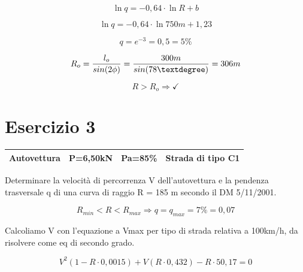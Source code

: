 \documentclass[
a4paper,
12pt, 
twoside]{scrbook}
\begin{document}
{{{{{{{{   \begin{equation}
    \ln q=-0,64\cdot \ln R+b
   \end{equation} 	
   
   \begin{equation}
   	\ln q=-0,64\cdot \ln 750m+1,23
   \end{equation} 	
   
   \begin{equation}
   	q=e^{-3}=0,5=5\%
   \end{equation} 	
   
   \begin{equation}
   	R_o=\frac{l_o}{sin(2\phi)}=\frac{300m}{sin(78\textdegree)}=306m
   \end{equation} 	
   
   \begin{equation}
   	R>R_o \Rightarrow \checkmark
   \end{equation} 	
   
   \section{Esercizio 3}
   {
   	\centering
   	\begin{tabular}{|c|c|c|c|}
   		\hline
   		\rule[-1ex]{0pt}{2.5ex}  Autovettura & P=6,50kN & Pa=85\% & Strada di tipo C1 \\
   		\hline
   	\end{tabular}\par
   }
   \begin{boxK}
   	Determinare la velocità di percorrenza V dell'autovettura e la pendenza trasversale q di una curva di raggio      R = 185 m secondo il DM 5/11/2001. 
   \end{boxK} 
    
   \begin{equation}
   	R_{min}<R<R_{max}\Rightarrow q=q_{max}=7\%=0,07
   \end{equation} 	
   
   \begin{boxF}
   	Calcoliamo V con l'equazione a Vmax per tipo di strada relativa a 100km/h, da risolvere come eq di secondo grado.
   \end{boxF}
   
   \begin{equation}
   	V^2(1-R\cdot0,0015)+V(R\cdot 0,432)-R\cdot 50,17=0
   \end{equation} 	
   
}}}}}}}}
\end{document}
